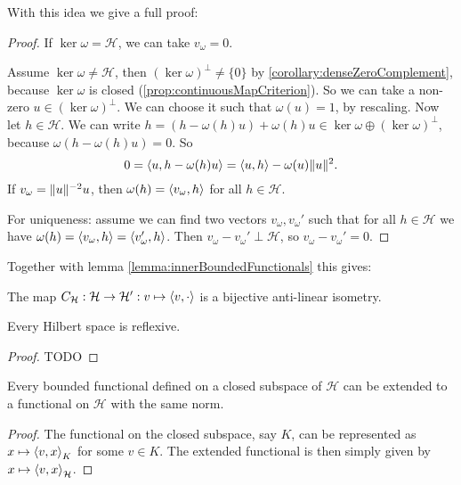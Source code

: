 With this idea we give a full proof:
\begin{proof}
If $\ker\omega = \mathcal{H}$, we can take $v_\omega = 0$.

Assume $\ker\omega\neq \mathcal{H}$, then $(\ker\omega)^\perp\neq \{0\}$ by \ref{corollary:denseZeroComplement}, because $\ker\omega$ is closed (\ref{prop:continuousMapCriterion}). So we can take a non-zero $u\in (\ker\omega)^\perp$. We can choose it such that $\omega(u) = 1$, by rescaling. Now let $h\in\mathcal{H}$. We can write $h = (h - \omega(h)u)+\omega(h)u\in\ker\omega\oplus (\ker\omega)^\perp$, because $\omega(h - \omega(h)u) = 0$. So
\[ 0 = \left\langle u,h - \omega(h)u \right\rangle = \left\langle u,h \right\rangle - \omega(u)\lVert u\rVert^2. \]
If $v_\omega = \lVert u\rVert^{-2}u$, then $\omega(h) = \left\langle v_\omega, h \right\rangle$ for all $h\in\mathcal{H}$.

For uniqueness: assume we can find two vectors $v_\omega,v_\omega'$ such that for all $h\in\mathcal{H}$ we have $\omega(h) = \left\langle v_\omega, h \right\rangle = \left\langle v_\omega', h \right\rangle$. Then $v_\omega - v_\omega'\perp \mathcal{H}$, so $v_\omega - v_\omega'= 0$.
\end{proof}
Together with lemma \ref{lemma:innerBoundedFunctionals} this gives:
\begin{corollary} \label{corollary:RieszIsometry}
The map $C_\mathcal{H}:\mathcal{H}\to {\mathcal{H}}^\prime: v\mapsto \left\langle v,\cdot \right\rangle$ is a bijective anti-linear isometry.
\end{corollary}
\begin{corollary}
Every Hilbert space is reflexive.
\end{corollary}
\begin{proof}
TODO
\end{proof}
\begin{corollary}
Every bounded functional defined on a closed subspace of $\mathcal{H}$ can be extended to a functional on $\mathcal{H}$ with the same norm.
\end{corollary}
\begin{proof}
The functional on the closed subspace, say $K$, can be represented as $x\mapsto \left\langle v,x \right\rangle_K$ for some $v\in K$. The extended functional is then simply given by $x\mapsto \left\langle v,x \right\rangle_\mathcal{H}$.
\end{proof}

